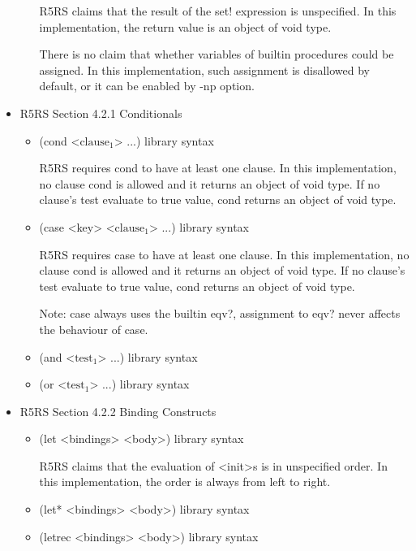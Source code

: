\documentclass{article}
\begin{document}
\begin{itemize}
\begin{itemize}
		R5RS claims that the result of the set! expression is unspecified. In this implementation, the return value is an object of void type.
		
		There is no claim that whether variables of builtin procedures could be assigned. In this implementation, such assignment is disallowed by default, or it can be enabled by -np option.
	\end{itemize}
	
\item R5RS Section 4.2.1 Conditionals
	\begin{itemize}
		\item (cond <$\textrm{clause}_1$> ...)	\hfill	library syntax
		
		R5RS requires cond to have at least one clause. In this implementation, no clause cond is allowed and it returns an object of void type. If no clause's test evaluate to true value, cond returns an object of void type.
		
		\item (case <key> <$\textrm{clause}_1$> ...)	\hfill	library syntax
		
		R5RS requires case to have at least one clause. In this implementation, no clause cond is allowed and it returns an object of void type. If no clause's test evaluate to true value, cond returns an object of void type.
		
		Note: case always uses the builtin eqv?, assignment to eqv? never affects the behaviour of case.
	
		\item (and <$\textrm{test}_1$> ...)	\hfill	library syntax
		
		\item (or <$\textrm{test}_1$> ...)	\hfill	library syntax
	\end{itemize}
	
\item R5RS Section 4.2.2 Binding Constructs
	\begin{itemize}
		\item (let <bindings> <body>)	\hfill	library syntax
		
		R5RS claims that the evaluation of <init>s is in unspecified order. In this implementation, the order is always from left to right.
		
		\item (let* <bindings> <body>)	\hfill	library syntax
		
		\item (letrec <bindings> <body>)	\hfill library syntax
		

\end{itemize}
\end{itemize}
\end{document}
